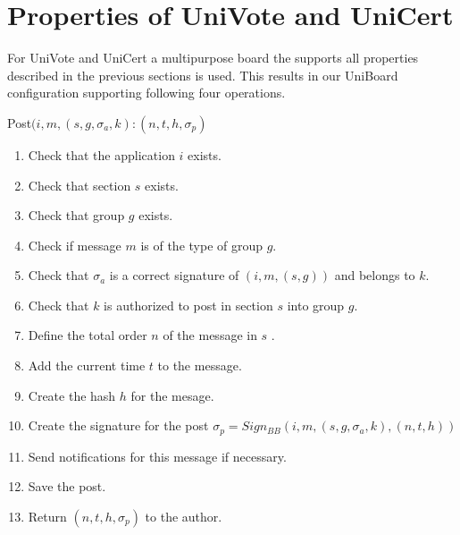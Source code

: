 \documentclass[bibtotoc,halfparskip,oneside]{scrreprt}
\begin{document}
\section{Properties of UniVote and UniCert}

For UniVote and UniCert a multipurpose board the supports all properties described in the previous sections is used. This results in our UniBoard configuration supporting following four operations.

Post$(i, m, (s, g, \sigma_a, k):(n, t , h, \sigma_p)$
\begin{enumerate}
	\item Check that the application $i$ exists.
	\item Check that section $s$ exists.
	\item Check that group $g$ exists.
	\item Check if message $m$ is of the type of group $g$.
	\item Check that $\sigma_a$ is a correct signature of $(i, m, (s, g))$ and belongs to $k$.
	\item Check that $k$ is authorized to post in section $s$ into group $g$.
	\item Define the total order $n$ of the message in $s$ .
	\item Add the current time $t$ to the message.
	\item Create the hash $h$ for the mesage.
	\item Create the signature for the post $\sigma_p=Sign_{BB}(i, m, (s, g, \sigma_a , k), (n, t, h))$
	\item Send notifications for this message if necessary.
	\item Save the post.
	\item Return $(n, t, h, \sigma_p)$ to the author.
\end{enumerate}
\end{document}
